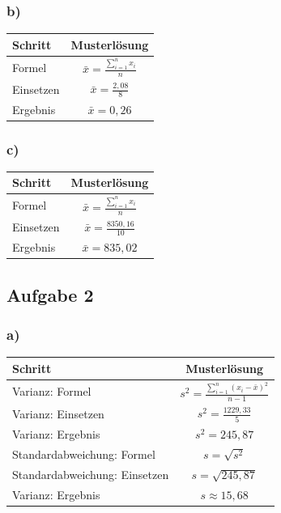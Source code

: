 \documentclass[
  11pt,
  ngerman,
  a4paper,
]{report}
\begin{document}
\hypertarget{b-2}{%
\subsubsection{b)}\label{b-2}}

\begin{table}[H]
\centering
\begin{tabular}{lc}
\toprule
Schritt & Musterlösung\\
\midrule
Formel & $\bar{x}=\frac{\sum\limits_{i=1}^{n}x_{i}}{n}$\\
Einsetzen & $\bar{x}=\frac{2{,}08}{8}$\\
Ergebnis & $\bar{x}=0{,}26$\\
\bottomrule
\end{tabular}
\end{table}

\hypertarget{c-2}{%
\subsubsection{c)}\label{c-2}}

\begin{table}[H]
\centering
\begin{tabular}{lc}
\toprule
Schritt & Musterlösung\\
\midrule
Formel & $\bar{x}=\frac{\sum\limits_{i=1}^{n}x_{i}}{n}$\\
Einsetzen & $\bar{x}=\frac{8350{,}16}{10}$\\
Ergebnis & $\bar{x}=835{,}02$\\
\bottomrule
\end{tabular}
\end{table}

\hypertarget{aufgabe-2-2}{%
\subsection{Aufgabe 2}\label{aufgabe-2-2}}

\hypertarget{a-3}{%
\subsubsection{a)}\label{a-3}}

\begin{table}[H]
\centering
\begin{tabular}{lc}
\toprule
Schritt & Musterlösung\\
\midrule
Varianz: Formel & $s^2=\frac{\sum\limits_{i=1}^{n}(x_{i}-\bar{x})^2}{n-1}$\\
Varianz: Einsetzen & $s^2=\frac{1229{,}33}{5}$\\
Varianz: Ergebnis & $s^2=245{,}87$\\
Standardabweichung: Formel & $s=\sqrt{s^2}$\\
Standardabweichung: Einsetzen & $s=\sqrt{245{,}87}$\\
Varianz: Ergebnis & $s\approx15{,}68$\\
\bottomrule
\end{tabular}
\end{table}
\end{document}
